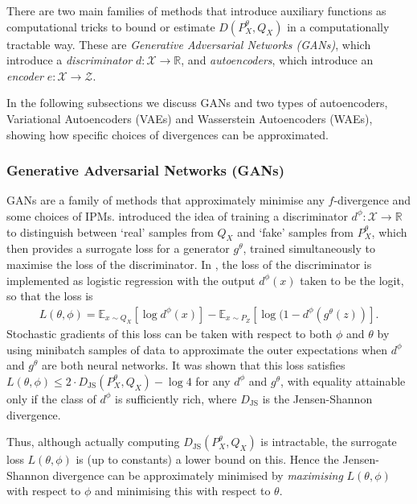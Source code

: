 There are two main families of methods that introduce auxiliary functions as computational tricks to bound or estimate $D(P^\theta_X, Q_X)$ in a computationally tractable way.
These are \emph{Generative Adversarial Networks (GANs)}, which introduce a \emph{discriminator} $d:\mathcal{X} \to \mathbb{R}$, and \emph{autoencoders}, which introduce an \emph{encoder} $e:\mathcal{X} \to \mathcal{Z}$.

In the following subsections we discuss GANs and two types of autoencoders, Variational Autoencoders (VAEs) and Wasserstein Autoencoders (WAEs), showing how specific choices of divergences can be approximated.

\subsubsection{Generative Adversarial Networks (GANs)}

GANs are a family of methods that approximately minimise any $f$-divergence and some choices of IPMs. 
\cite{goodfellow2014generative} introduced the idea of training a discriminator $d^\phi: \mathcal{X} \to \mathbb{R}$ to distinguish between `real' samples from $Q_X$ and `fake' samples from $P^\theta_X$, which then provides a surrogate loss for a generator $g^\theta$, trained simultaneously to maximise the loss of the discriminator. 
In \cite{goodfellow2014generative}, the loss of the discriminator is implemented as logistic regression with the output $d^\phi(x)$ taken to be the logit, so that the loss is
%
\begin{align*}
L(\theta, \phi) = \mathbb{E}_{x\sim Q_X}\left[ \log d^\phi(x) \right] - \mathbb{E}_{x \sim P_Z} \left[\log(1 - d^\phi(g^\theta(z)) \right].
\end{align*}
%
Stochastic gradients of this loss can be taken with respect to both $\phi$ and $\theta$ by using minibatch samples of data to approximate the outer expectations when $d^\phi$ and $g^\theta$ are both neural networks.
It was shown that this loss satisfies $L(\theta, \phi) \leq 2 \cdot D_{\text{JS}}(P^\theta_X, Q_X) - \log 4$ for any $d^\phi$ and $g^\theta$, with equality attainable only if the class of $d^\phi$ is sufficiently rich, where $D_{\text{JS}}$ is the Jensen-Shannon divergence.

Thus, although actually computing $D_{\text{JS}}(P^\theta_X, Q_X)$ is intractable, the surrogate loss $L(\theta, \phi)$ is (up to constants) a lower bound on this.
Hence the Jensen-Shannon divergence can be approximately minimised by \emph{maximising} $L(\theta, \phi)$ with respect to $\phi$ and minimising this with respect to $\theta$.

